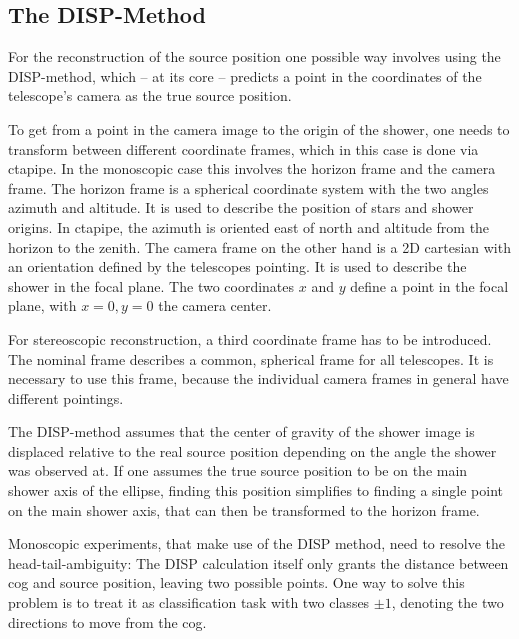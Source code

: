 \subsection{The DISP-Method}
For the reconstruction of the source position
one possible way involves using the DISP-method,
which -- at its core -- predicts a point in the coordinates
of the telescope's camera as the true source position.

To get from a point in the camera image to the origin of the shower,
one needs to transform between different coordinate frames,
which in this case is done via ctapipe.
In the monoscopic case this involves the horizon frame 
and the camera frame.
The horizon frame is a spherical coordinate system with the two angles azimuth and altitude.
It is used to describe the position of stars and shower origins.
In ctapipe, the azimuth is oriented east of north and altitude from the horizon 
to the zenith.
The camera frame on the other hand is a 
2D cartesian with an orientation defined by the telescopes pointing.
It is used to describe the shower in the focal plane.
The two coordinates $x$ and $y$ define a point in the focal plane,
with $x=0, y=0$ the camera center. 

For stereoscopic reconstruction, a third coordinate frame has to be introduced.
The nominal frame describes a common, spherical frame for all telescopes.
It is necessary to use this frame, because the individual camera frames 
in general have different pointings.

The DISP-method assumes that the 
center of gravity of the shower image is displaced relative to the
real source position depending on the angle the shower was observed at.
If one assumes the true source position to be on the main shower axis of the ellipse,
finding this position simplifies to finding a single point on the main shower axis, that 
can then be transformed to the horizon frame.

Monoscopic experiments, that make use of the DISP method, need to resolve the head-tail-ambiguity:
The DISP calculation itself only grants the distance between
cog and source position, leaving two possible points.
One way to solve this problem is to treat it as classification task with two
classes $\pm1$, denoting the two directions to move from the cog.

